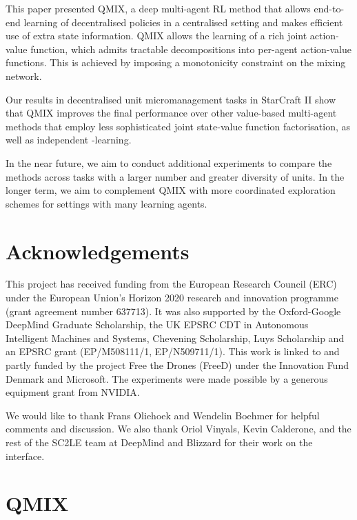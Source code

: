 \documentclass{article}
\begin{document}
This paper presented QMIX, a deep multi-agent RL method that allows end-to-end learning of decentralised policies in a centralised setting and makes efficient use of extra state information. QMIX allows the learning of a rich joint action-value function, which admits tractable decompositions into per-agent action-value functions. This is achieved by imposing a monotonicity constraint on the mixing network.

Our results in decentralised unit micromanagement tasks in StarCraft II show that QMIX improves the final performance over other value-based multi-agent methods that employ less sophisticated joint state-value function factorisation, as well as independent -learning. 

In the near future, we aim to conduct additional experiments to compare the methods across tasks with a larger number and greater diversity of units. In the longer term, we aim to complement QMIX with more coordinated exploration schemes for settings with many learning agents. 
\section*{Acknowledgements} 

This project has received funding from the European Research Council (ERC) under the European Union's Horizon 2020 research and innovation programme (grant agreement number 637713). 
It was also supported by the Oxford-Google DeepMind Graduate Scholarship, the UK EPSRC CDT in Autonomous Intelligent Machines and Systems, Chevening Scholarship, Luys Scholarship and an EPSRC grant (EP/M508111/1, EP/N509711/1). This work is linked to and partly funded by the project Free the Drones (FreeD) under the Innovation Fund Denmark and Microsoft. The experiments were made possible by a generous equipment grant from NVIDIA.

We would like to thank Frans Oliehoek and Wendelin Boehmer for helpful comments and discussion. 
We also thank Oriol Vinyals, Kevin Calderone, and the rest of the SC2LE team at DeepMind and Blizzard for their work on the interface.

 






\onecolumn
\newpage
\appendix
\section{QMIX}
\end{document}

